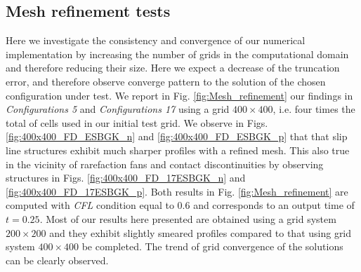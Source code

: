 \documentclass{rsproca}%
\begin{document}
\subsection{Mesh refinement tests}
Here we investigate the consistency and convergence of our numerical implementation by increasing the number of grids in the computational domain and therefore reducing their size. Here we expect a decrease of the truncation error, and therefore observe converge pattern to the solution of the chosen configuration under test. We report in Fig. \ref{fig:Mesh_refinement} our findings in \emph{Configurations 5} and \emph{Configurations 17} using a grid $400\times400$, i.e. four times the total of cells used in our initial test grid. We observe in Figs. \ref{fig:400x400_FD_ESBGK_n} and \ref{fig:400x400_FD_ESBGK_p} that that slip line structures exhibit much sharper profiles with a refined mesh. This also true in the vicinity of rarefaction fans and contact discontinuities by observing structures in Figs. \ref{fig:400x400_FD_17ESBGK_n} and \ref{fig:400x400_FD_17ESBGK_p}. Both results in Fig. \ref{fig:Mesh_refinement} are computed with \emph{CFL} condition equal to 0.6 and corresponds to an output time of $t=0.25$. Most of our results here presented are obtained using a grid system $200\times200$ and they exhibit slightly smeared profiles compared to that using grid system $400\times400$ be completed.  The trend of grid convergence of the solutions can be clearly observed.
\end{document}
